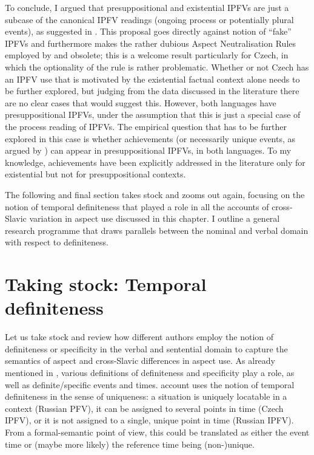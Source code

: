 \documentclass[output=paper,colorlinks,citecolor=brown]{langscibook}
\begin{document}
To conclude, I argued that presuppositional and existential IPFVs are just a subcase of the canonical IPFV readings (ongoing process or potentially plural events), as suggested in \citet{gehrke22}. This proposal goes directly against  notion of ``fake'' IPFVs and furthermore makes the rather dubious Aspect Neutralisation Rules employed by \citet{gronnstechow10,gronnstechow16} and \citet{alvestad13} obsolete; this is a welcome result particularly for Czech, in which the optionality of the rule is rather problematic. Whether or not Czech has an IPFV use that is motivated by the existential factual context alone needs to be further explored, but judging from the data discussed in the literature there are no clear cases that would suggest this. However, both languages have presuppositional IPFVs, under the assumption that this is just a special case of the process reading of IPFVs. The empirical question that has to be further explored in this case is whether achievements (or necessarily unique events, as argued by \citealt{Mueller-Reichau2018a}) can appear in presuppositional IPFVs, in both languages. To my knowledge, achievements have been explicitly addressed in the literature only for existential but not for presuppositional contexts. 

The following and final section takes stock and zooms out again, focusing on the notion of temporal definiteness that played a role in all the accounts of cross-Slavic variation in aspect use discussed in this chapter. I outline a general research programme that draws parallels between the nominal and verbal domain with respect to definiteness.

\section{Taking stock: Temporal definiteness}
\label{sec:definiteness}

Let us take stock and review how different authors employ the notion of definiteness or specificity in the verbal and sentential domain to capture the semantics of aspect and cross-Slavic differences in aspect use. As already mentioned in , various definitions of definiteness and specificity play a role, as well as definite/specific events and times.  account uses the notion of temporal definiteness in the sense of uniqueness: a situation is uniquely locatable in a context (Russian PFV), it can be assigned to several points in time (Czech IPFV), or it is not assigned to a single, unique point in time (Russian IPFV). From a formal-semantic point of view, this could be translated as either the event time or (maybe more likely) the reference time being (non-)unique. 
\end{document}
